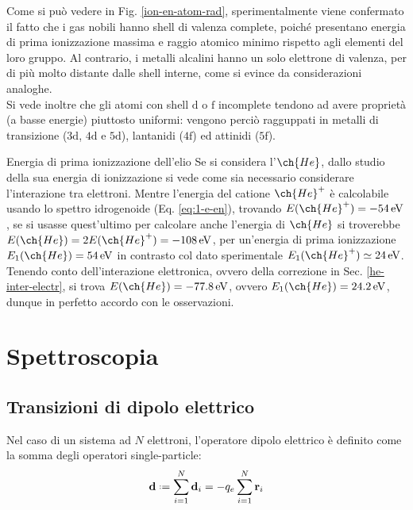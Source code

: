 Come si può vedere in Fig. \ref{ion-en-atom-rad}, sperimentalmente viene confermato il fatto che i gas nobili hanno shell di valenza complete, poiché presentano energia di prima ionizzazione massima e raggio atomico minimo rispetto agli elementi del loro gruppo. Al contrario, i metalli alcalini hanno un solo elettrone di valenza, per di più molto distante dalle shell interne, come si evince da considerazioni analoghe. \\
Si vede inoltre che gli atomi con shell $ \text{d} $ o $ \text{f} $ incomplete tendono ad avere proprietà (a basse energie) piuttosto uniformi: vengono perciò ragguppati in metalli di transizione ($ \text{3d} $, $ \text{4d} $ e $ \text{5d} $), lantanidi ($ \text{4f} $) ed attinidi ($ \text{5f} $).

\begin{example}{Energia di prima ionizzazione dell'elio}{}
	Se si considera l'$ \ch{He} $, dallo studio della sua energia di ionizzazione si vede come sia necessario considerare l'interazione tra elettroni. Mentre l'energia del catione $ \ch{He}^+ $ è calcolabile usando lo spettro idrogenoide (Eq. \ref{eq:1-e-en}), trovando $ E(\ch{He}^+) = -54\ev $, se si usasse quest'ultimo per calcolare anche l'energia di $ \ch{He} $ si troverebbe $ E(\ch{He}) = 2 E(\ch{He}^+) = - 108\ev $, per un'energia di prima ionizzazione $ E_1(\ch{He}) = 54\ev $ in contrasto col dato sperimentale $ E_1(\ch{He}^+) \simeq 24\ev $. Tenendo conto dell'interazione elettronica, ovvero della correzione in Sec. \ref{he-inter-electr}, si trova $ E(\ch{He}) = -77.8\ev $, ovvero $ E_1(\ch{He}) = 24.2\ev $, dunque in perfetto accordo con le osservazioni.
\end{example}

\newpage

\section{Spettroscopia}

\subsection{Transizioni di dipolo elettrico}

Nel caso di un sistema ad $ N $ elettroni, l'operatore dipolo elettrico è definito come la somma degli operatori single-particle:
\begin{equation}
	\ve{d} \defeq \sum_{i = 1}^{N} \ve{d}_i = - q_e \sum_{i = 1}^{N} \ve{r}_i
\end{equation}

